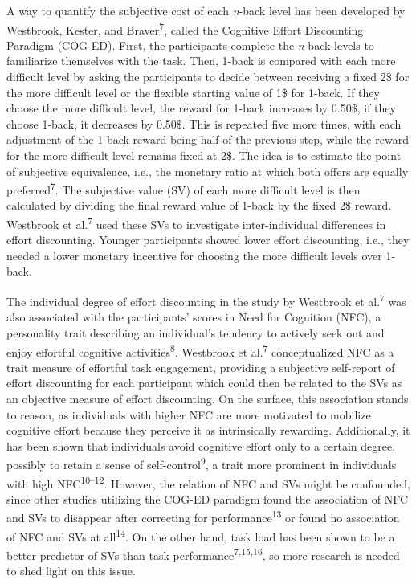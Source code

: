 \documentclass[
  man,floatsintext]{apa6}
\begin{document}
A way to quantify the subjective cost of each \emph{n}-back level has been developed by Westbrook, Kester, and Braver\textsuperscript{7}, called the Cognitive Effort Discounting Paradigm (COG-ED).
First, the participants complete the \emph{n}-back levels to familiarize themselves with the task.
Then, 1-back is compared with each more difficult level by asking the participants to decide between receiving a fixed 2\$ for the more difficult level or the flexible starting value of 1\$ for 1-back.
If they choose the more difficult level, the reward for 1-back increases by 0.50\$, if they choose 1-back, it decreases by 0.50\$.
This is repeated five more times, with each adjustment of the 1-back reward being half of the previous step, while the reward for the more difficult level remains fixed at 2\$.
The idea is to estimate the point of subjective equivalence, i.e., the monetary ratio at which both offers are equally preferred\textsuperscript{7}.
The subjective value (SV) of each more difficult level is then calculated by dividing the final reward value of 1-back by the fixed 2\$ reward.
Westbrook et al.\textsuperscript{7} used these SVs to investigate inter-individual differences in effort discounting.
Younger participants showed lower effort discounting, i.e., they needed a lower monetary incentive for choosing the more difficult levels over 1-back.

The individual degree of effort discounting in the study by Westbrook et al.\textsuperscript{7} was also associated with the participants' scores in Need for Cognition (NFC), a personality trait describing an individual's tendency to actively seek out and enjoy effortful cognitive activities\textsuperscript{8}.
Westbrook et al.\textsuperscript{7} conceptualized NFC as a trait measure of effortful task engagement, providing a subjective self-report of effort discounting for each participant which could then be related to the SVs as an objective measure of effort discounting.
On the surface, this association stands to reason, as individuals with higher NFC are more motivated to mobilize cognitive effort because they perceive it as intrinsically rewarding.
Additionally, it has been shown that individuals avoid cognitive effort only to a certain degree, possibly to retain a sense of self-control\textsuperscript{9}, a trait more prominent in individuals with high NFC\textsuperscript{10--12}.
However, the relation of NFC and SVs might be confounded, since other studies utilizing the COG-ED paradigm found the association of NFC and SVs to disappear after correcting for performance\textsuperscript{13} or found no association of NFC and SVs at all\textsuperscript{14}.
On the other hand, task load has been shown to be a better predictor of SVs than task performance\textsuperscript{7,15,16}, so more research is needed to shed light on this issue.
\end{document}
